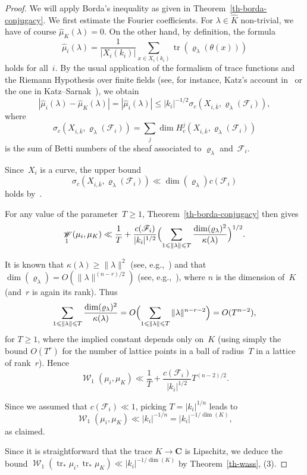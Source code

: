 \documentclass[12pt]{amsart}
\renewcommand{\mathcal}{\mathscr}
\renewcommand{\leq}{\leqslant}
\renewcommand{\geq}{\geqslant}
\newcommand{\Cc}{\mathbf{C}}
\DeclareMathOperator{\wass}{\mathcal{W}}
\DeclareMathOperator{\Tr}{tr}
\renewcommand{\rho}{\varrho}
\theoremstyle{plain}
\theoremstyle{remark}
\theoremstyle{definition}
\renewcommand{\geq}{\geqslant}
\renewcommand{\leq}{\leqslant}
\begin{document}
\begin{proof}
  We will apply Borda's inequality as given in
  Theorem~\ref{th-borda-conjugacy}. We first estimate the Fourier
  coefficients. For $\lambda\in \widehat{K}$ non-trivial, we have of
  course $\widehat{\mu}_K(\lambda)=0$. On the other hand, by
  definition, the formula
  \[
    \widehat{\mu}_i(\lambda)
    =\frac{1}{|X_i(k_i)|}
    \sum_{x\in X_i(k_i)}\Tr(\rho_{\lambda}(\theta(x)))
  \]
  holds for all~$i$.  By the usual application of the formalism of
  trace functions and the Riemann Hypothesis over finite fields (see,
  for instance, Katz's account in~\cite[Ch.\,3]{gkm} or the one in
  Katz--Sarnak~\cite[Th.\,9.2.6]{katz-sarnak}), we obtain
  \begin{equation}\label{eq-basic-weyl-bound}
    |\widehat{\mu}_i(\lambda)-\widehat{\mu}_K(\lambda)|=
    |\widehat{\mu}_i(\lambda)|\leq
    |k_i|^{-1/2}\sigma_c(X_{i,\bar{k}},\rho_{\lambda}(\mathcal{F}_i)),
  \end{equation}
  where
  \[
    \sigma_c(X_{i,\bar{k}},\rho_{\lambda}(\mathcal{F}_i))=
    \sum_j \dim H^j_c(X_{i,\bar{k}},\rho_{\lambda}(\mathcal{F}_i))
  \]
  is the sum of Betti numbers of the sheaf associated to
  $\rho_{\lambda}$ and~$\mathcal{F}_i$.
  
  Since~$X_i$ is a curve, the upper bound
  \[
    \sigma_c(X_{i,\bar{k}},\rho_{\lambda}(\mathcal{F}_i))\ll
    \dim(\rho_{\lambda}) c(\mathcal{F}_i)
  \]
  holds by~\cite[Rem.\,6.34]{sffk}.

  For any value of the parameter~$T\geq 1$,
  Theorem~\ref{th-borda-conjugacy} then gives
  \[
    \wass_1(\mu_i,\mu_K)\ll
    \frac{1}{T}+\frac{c(\mathcal{F}_i)}{|k_i|^{1/2}} \Bigl(\sum_{1\leq
      \|\lambda\|\leq T}\frac{\dim(\rho_{\lambda})^2}{\kappa(\lambda)}
    \Bigr)^{1/2}.
  \]

  It is known that $\kappa(\lambda)\geq \|\lambda\|^2$ (see,
  e.g.,~\cite[p.\,77,\,Prop.\,4]{lie9}) and that
  $\dim(\rho_{\lambda})=O(\|\lambda\|^{(n-r)/2})$ (see,
  e.g.,~\cite[p.\,76,\,Cor.\,1]{lie9}), where $n$ is the dimension
  of~$K$ (and~$r$ is again its rank). Thus
  \[
    \sum_{1\leq \|\lambda\|\leq
      T}\frac{\dim(\rho_{\lambda})^2}{\kappa(\lambda)}= O\Bigl(
    \sum_{1\leq \|\lambda\|\leq T}\|\lambda\|^{n-r-2} \Bigr)=O(T^{n-2}),
  \]
  for $T\geq 1$, where the implied constant depends only on~$K$ (using
  simply the bound $O(T^r)$ for the number of lattice points in a ball
  of radius~$T$ in a lattice of rank~$r$). Hence
  \[
    \wass_1(\mu_i,\mu_K)\ll
    \frac{1}{T}+\frac{c(\mathcal{F}_i)}{|k_i|^{1/2}} T^{(n-2)/2}.
  \]

  Since we assumed that $c(\mathcal{F}_i)\ll 1$, picking
  $T=|k_i|^{1/n}$ leads to
  \[
    \wass_1(\mu_i,\mu_K)\ll |k_i|^{-1/n}=|k_i|^{-1/\dim(K)},
  \]
  as claimed.

  Since it is straightforward that the trace $K\to \Cc$ is Lipschitz,
  we deduce the bound
  $ \wass_1(\Tr_*\mu_i,\Tr_*\mu_K)\ll |k_i|^{-1/\dim(K)}$ by
  Theorem~\ref{th-wass}, (3).
\end{proof}
\end{document}
